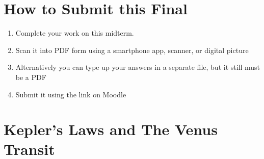 \documentclass[10pt]{article}
\begin{document}
\maketitle

\section{How to Submit this Final}

\begin{enumerate}
\item Complete your work on this midterm.
\item Scan it into PDF form using a smartphone app, scanner, or digital picture
\item Alternatively you can type up your answers in a separate file, but it still must be a PDF
\item Submit it using the link on Moodle
\end{enumerate}

\section{Kepler's Laws and The Venus Transit}
\end{document}
